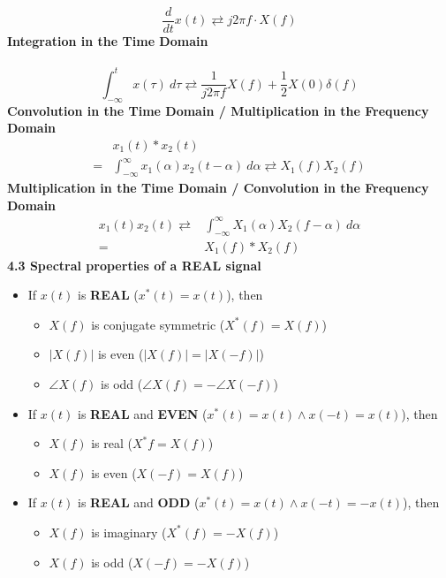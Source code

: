 \documentclass[6pt,landscape,a4paper]{extarticle}
\begin{document}
\begin{multicols*}{5}
    \[
        \frac{d}{dt}x(t) \rightleftarrows j2\pi f \cdot X(f) \tag{4.7}
    \]
    \textbf{Integration in the Time Domain}\\\\
    \[
        \int_{-\infty}^{t}x(\tau)\ d\tau \rightleftarrows \frac{1}{j2\pi f}X(f) + \frac{1}{2}X(0)\delta(f) \tag{4.8}
    \]
    \textbf{Convolution in the Time Domain / Multiplication in the Frequency Domain}
    \begin{align*}
        &x_1(t) * x_2(t) \\
        = &\int_{-\infty}^{\infty}x_1(\alpha)x_2(t-\alpha)\ d\alpha \rightleftarrows X_1(f)X_2(f) \tag{4.9a}
    \end{align*}
    \textbf{Multiplication in the Time Domain / Convolution in the Frequency Domain} 
    \begin{align*}
        x_1(t)x_2(t) \rightleftarrows &\int_{-\infty}^{\infty} X_1(\alpha)X_2(f-\alpha)\ d\alpha \\=&X_1(f)*X_2(f) \tag{4.9b}
    \end{align*}
    \textbf{4.3 Spectral properties of a REAL signal}\\
    \begin{itemize}
        \item If $x(t)$ is \textbf{REAL} ($x^*(t)=x(t)$), then
        \begin{itemize}
            \item $X(f)$ is conjugate symmetric \textcolor{black!70}{($X^*(f)=X(f)$)}
            \item $|X(f)|$ is even \textcolor{black!70}{($|X(f)|=|X(-f)|$)}
            \item $\angle X(f)$ is odd \textcolor{black!70}{($\angle X(f)=-\angle X(-f)$)}
        \end{itemize}
        \item If $x(t)$ is \textbf{REAL} and \textbf{EVEN} ($x^*(t)=x(t) \wedge x(-t)=x(t)$), then
        \begin{itemize}
            \item $X(f)$ is real \textcolor{black!70}{($X^*f=X(f)$)}
            \item $X(f)$ is even \textcolor{black!70}{($X(-f)=X(f)$)}
        \end{itemize}
        \item If $x(t)$ is \textbf{REAL} and \textbf{ODD} ($x^*(t)=x(t) \wedge x(-t)=-x(t)$), then
        \begin{itemize}
            \item $X(f)$ is imaginary \textcolor{black!70}{($X^*(f) = -X(f)$)}
            \item $X(f)$ is odd \textcolor{black!70}{($X(-f)=-X(f)$)}
        \end{itemize}
    \end{itemize}


\end{multicols*}
\end{document}
